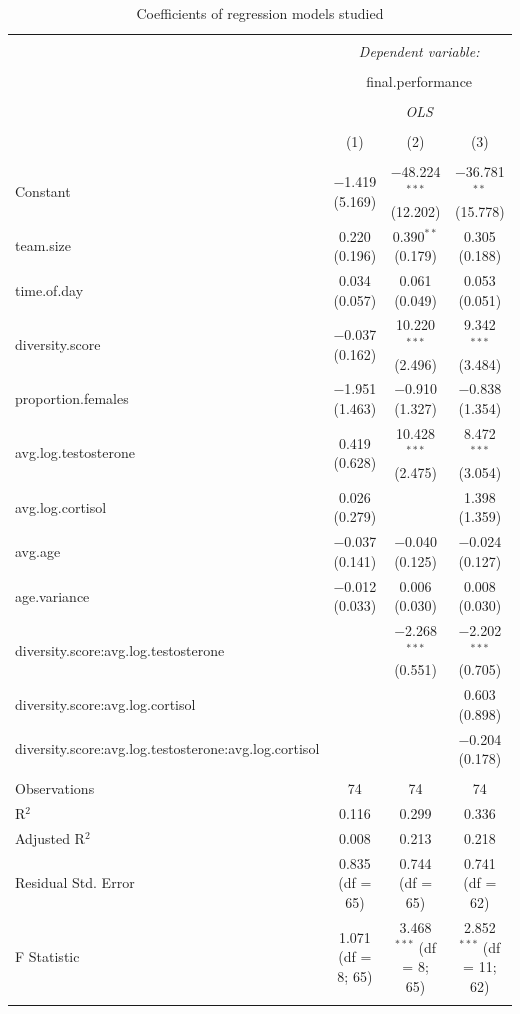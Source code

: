\documentclass[]{article}
\begin{document}
\begin{table}[!htbp] \centering 
  \caption{Coefficients of regression models studied} 
  \label{tab:regression} 
\small 
\begin{tabular}{@{\extracolsep{1pt}}lccc} 
\\[-1.8ex]\hline 
\hline \\[-1.8ex] 
 & \multicolumn{3}{c}{\textit{Dependent variable:}} \\ 
\cline{2-4} 
\\[-1.8ex] & \multicolumn{3}{c}{final.performance} \\ 
\\[-1.8ex] & \multicolumn{3}{c}{\textit{OLS}} \\ 
\\[-1.8ex] & (1) & (2) & (3)\\ 
\hline \\[-1.8ex] 
 Constant & $-$1.419 (5.169) & $-$48.224$^{***}$ (12.202) & $-$36.781$^{**}$ (15.778) \\ 
  team.size & 0.220 (0.196) & 0.390$^{**}$ (0.179) & 0.305 (0.188) \\ 
  time.of.day & 0.034 (0.057) & 0.061 (0.049) & 0.053 (0.051) \\ 
  diversity.score & $-$0.037 (0.162) & 10.220$^{***}$ (2.496) & 9.342$^{***}$ (3.484) \\ 
  proportion.females & $-$1.951 (1.463) & $-$0.910 (1.327) & $-$0.838 (1.354) \\ 
  avg.log.testosterone & 0.419 (0.628) & 10.428$^{***}$ (2.475) & 8.472$^{***}$ (3.054) \\ 
  avg.log.cortisol & 0.026 (0.279) &  & 1.398 (1.359) \\ 
  avg.age & $-$0.037 (0.141) & $-$0.040 (0.125) & $-$0.024 (0.127) \\ 
  age.variance & $-$0.012 (0.033) & 0.006 (0.030) & 0.008 (0.030) \\ 
  diversity.score:avg.log.testosterone &  & $-$2.268$^{***}$ (0.551) & $-$2.202$^{***}$ (0.705) \\ 
  diversity.score:avg.log.cortisol &  &  & 0.603 (0.898) \\ 
  diversity.score:avg.log.testosterone:avg.log.cortisol &  &  & $-$0.204 (0.178) \\ 
 \hline \\[-1.8ex] 
Observations & 74 & 74 & 74 \\ 
R$^{2}$ & 0.116 & 0.299 & 0.336 \\ 
Adjusted R$^{2}$ & 0.008 & 0.213 & 0.218 \\ 
Residual Std. Error & 0.835 (df = 65) & 0.744 (df = 65) & 0.741 (df = 62) \\ 
F Statistic & 1.071 (df = 8; 65) & 3.468$^{***}$ (df = 8; 65) & 2.852$^{***}$ (df = 11; 62) \\ 
\hline 
\hline \\[-1.8ex] 
\end{tabular} 
\end{table}
\end{document}
